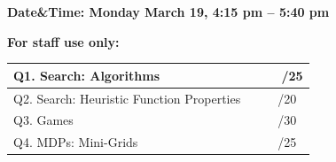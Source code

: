 \begin{titlepage}
\textbf{Date\&Time: Monday March 19, 4:15 pm -- 5:40 pm}

\vfill %

 \begin{center}
{\bf For staff use only:}\\
      \begin{tabular}{|l|l|}
        \hline
        Q1. Search: Algorithms & ~~~~/25 \\
        \hline        
        Q2. Search: Heuristic Function Properties & ~~~~/20 \\
        \hline
        Q3. Games & ~~~~/30 \\
        \hline
        Q4. MDPs: Mini-Grids & ~~~~/25 \\
        \hline
      \end{tabular}%
 \end{center}


\makeatother


\end{titlepage}

